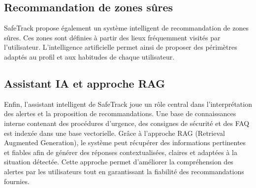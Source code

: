 \subsection{Recommandation de zones sûres}

SafeTrack propose également un système intelligent de recommandation de zones sûres. Ces zones sont définies à partir des lieux fréquemment visités par l’utilisateur. L’intelligence artificielle permet ainsi de proposer des périmètres adaptés au profil et aux habitudes de chaque utilisateur.

\subsection{Assistant IA et approche RAG}

Enfin, l’assistant intelligent de SafeTrack joue un rôle central dans l’interprétation des alertes et la proposition de recommandations. Une base de connaissances interne contenant des procédures d’urgence, des consignes de sécurité et des FAQ est indexée dans une base vectorielle. Grâce à l’approche RAG (Retrieval Augmented Generation), le système peut récupérer des informations pertinentes et fiables afin de générer des réponses contextualisées, claires et adaptées à la situation détectée. Cette approche permet d’améliorer la compréhension des alertes par les utilisateurs tout en garantissant la fiabilité des recommandations fournies.
